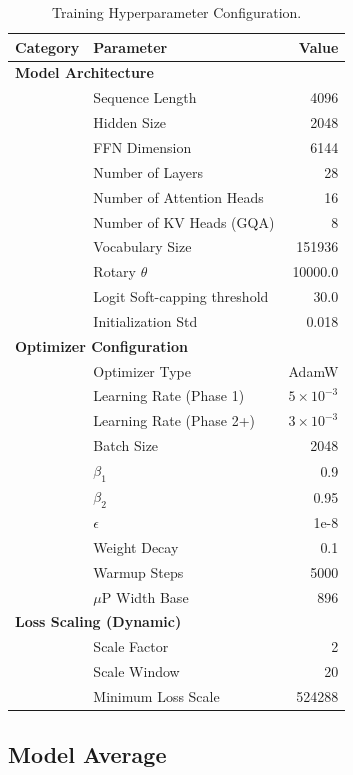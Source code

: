 \begin{table}[htbp]
\centering
\caption{Training Hyperparameter Configuration.}
\label{tab:training_config}
\begin{tabular}{@{}llr@{}}
\toprule
\textbf{Category} & \textbf{Parameter} & \textbf{Value} \\
\midrule
\multicolumn{3}{l}{\textbf{Model Architecture}} \\
& Sequence Length & 4096 \\
& Hidden Size & 2048 \\
& FFN Dimension & 6144 \\
& Number of Layers & 28 \\
& Number of Attention Heads & 16 \\
& Number of KV Heads (GQA) & 8 \\
& Vocabulary Size & 151936 \\
& Rotary $\theta$ & 10000.0 \\
& Logit Soft-capping threshold & 30.0 \\
& Initialization Std & 0.018 \\
\midrule
\multicolumn{3}{l}{\textbf{Optimizer Configuration}} \\
& Optimizer Type & AdamW \\
& Learning Rate (Phase 1) & $5\times 10^{-3}$ \\
& Learning Rate (Phase 2+) & $3\times 10^{-3}$ \\
& Batch Size & 2048 \\
& $\beta_1$ & 0.9 \\
& $\beta_2$ & 0.95 \\
& $\epsilon$ & 1e-8 \\
& Weight Decay & 0.1 \\
& Warmup Steps & 5000 \\
& $\mu$P Width Base & 896 \\
\midrule
\multicolumn{3}{l}{\textbf{Loss Scaling (Dynamic)}} \\
& Scale Factor & 2 \\
& Scale Window & 20 \\
& Minimum Loss Scale & 524288 \\
\bottomrule
\end{tabular}
\end{table}

\subsection{Model Average}\label{sec:model_average}

